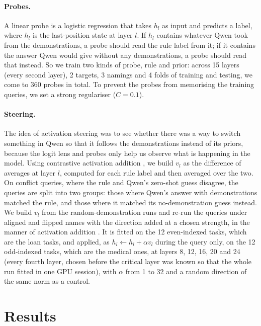 \paragraph{Probes.}
A linear probe \citep{alain2017understanding} is a logistic regression that takes $h_l$ as input and predicts a label, where $h_l$ is the last-position state at layer $l$. If $h_l$ contains whatever Qwen took from the demonstrations, a probe should read the rule label from it; if it contains the answer Qwen would give without any demonstrations, a probe should read that instead. So we train two kinds of probe, rule and prior: across 15 layers (every second layer), 2 targets, 3 namings and 4 folds of training and testing, we come to 360 probes in total. To prevent the probes from memorising the training queries, we set a strong regulariser ($C = 0.1$).

\paragraph{Steering.}
The idea of activation steering was to see whether there was a way to switch something in Qwen so that it follows the demonstrations instead of its priors, because the logit lens and probes only help us observe what is happening in the model. Using contrastive activation addition \citep{rimsky2024steering}, we build $v_l$ as the difference of averages at layer $l$, computed for each rule label and then averaged over the two. On conflict queries, where the rule and Qwen's zero-shot guess disagree, the queries are split into two groups: those where Qwen's answer with demonstrations matched the rule, and those where it matched its no-demonstration guess instead. We build $v_l$ from the random-demonstration runs and re-run the queries under aligned and flipped names with the direction added at a chosen strength, in the manner of activation addition \citep{turner2023activation}. It is fitted on the 12 even-indexed tasks, which are the loan tasks, and applied, as $h_l \leftarrow h_l + \alpha v_l$ during the query only, on the 12 odd-indexed tasks, which are the medical ones, at layers 8, 12, 16, 20 and 24 (every fourth layer, chosen before the critical layer was known so that the whole run fitted in one GPU session), with $\alpha$ from 1 to 32 and a random direction of the same norm as a control.

\section{Results}

